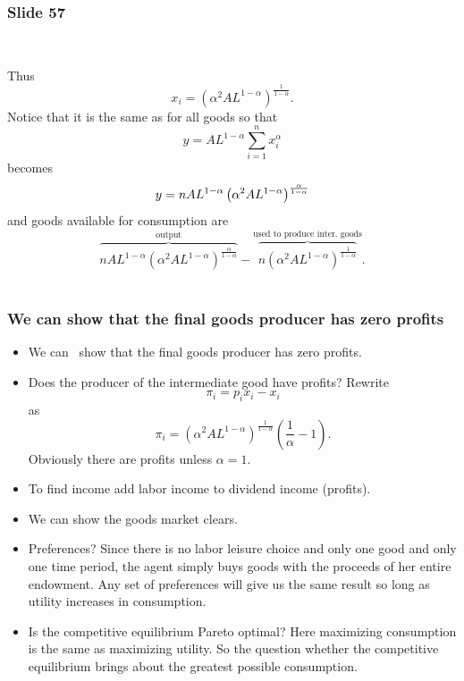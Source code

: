 \documentclass[aspectratio=169]{ltx-talk}
\begin{document}
\begin{frame}
\frametitle{Slide 57}
\ 

Thus%
\begin{equation*}
x_{i}=\left( \alpha ^{2}AL^{1-\alpha }\right) ^{\frac{1}{1-\alpha }}.
\end{equation*}%
Notice that it is the same as for all goods so that%
\begin{equation*}
y=AL^{1-\alpha }\overset{n}{\underset{i=1}{\sum }}x_{i}^{\alpha }
\end{equation*}%
becomes%
\begin{equation*}
y=nAL^{1-\alpha }\left( \alpha ^{2}AL^{1-\alpha }\right) ^{\frac{\alpha }{%
1-\alpha }}
\end{equation*}%
and goods available for consumption are 
\begin{equation*}
\overset{\text{output}}{\overbrace{nAL^{1-\alpha }\left( \alpha
^{2}AL^{1-\alpha }\right) ^{\frac{\alpha }{1-\alpha }}}}-\overset{\text{used
to produce inter. goods}}{\overbrace{n\left( \alpha ^{2}AL^{1-\alpha
}\right) ^{\frac{1}{1-\alpha }}}}.
\end{equation*}%
$\allowbreak $
\end{frame}

\begin{frame}
\frametitle{We can show that the final goods producer has zero profits}
\begin{itemize}
\item We can \ show that the final goods producer has zero profits.

\item Does the producer of the intermediate good have profits? Rewrite%
\begin{equation*}
\pi _{i}=p_{i}x_{i}-x_{i}
\end{equation*}%
as%
\begin{equation*}
\pi _{i}=\left( \alpha ^{2}AL^{1-\alpha }\right) ^{\frac{1}{1-\alpha }%
}\left( \frac{1}{\alpha }-1\right) .
\end{equation*}%
Obviously there are profits unless $\alpha =1.$

\item To find income add labor income to dividend income (profits).

\item We can show the goods market clears.

\item Preferences? Since there is no labor leisure choice and only one good
and only one time period, the agent simply buys goods with the proceeds of
her entire endowment. Any set of preferences will give us the same result so
long as utility increases in consumption.

\item Is the competitive equilibrium Pareto optimal? Here maximizing
consumption is the same as maximizing utility. So the question whether the
competitive equilibrium brings about the greatest possible consumption.
\end{itemize}
\end{frame}
\end{document}
